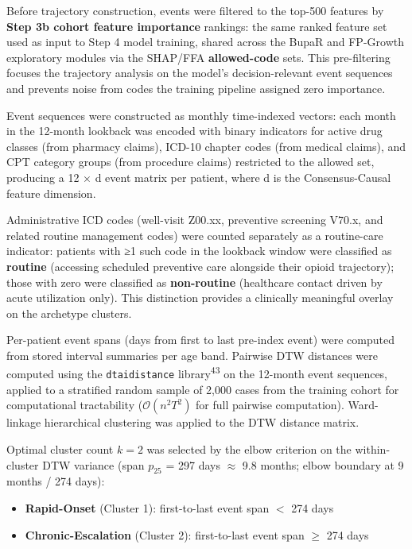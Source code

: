\documentclass[
  12pt,
]{book}
\providecommand{\tightlist}{%
  \setlength{\itemsep}{0pt}\setlength{\parskip}{0pt}}
\begin{document}
Before trajectory construction, events were filtered to the top-500
features by \textbf{Step 3b cohort feature importance} rankings: the
same ranked feature set used as input to Step 4 model training, shared
across the BupaR and FP-Growth exploratory modules via the SHAP/FFA
\textbf{allowed-code} sets. This pre-filtering focuses the trajectory
analysis on the model's decision-relevant event sequences and prevents
noise from codes the training pipeline assigned zero importance.

Event sequences were constructed as monthly time-indexed vectors: each
month in the 12-month lookback was encoded with binary indicators for
active drug classes (from pharmacy claims), ICD-10 chapter codes (from
medical claims), and CPT category groups (from procedure claims)
restricted to the allowed set, producing a 12 × d event matrix per
patient, where d is the Consensus-Causal feature dimension.

Administrative ICD codes (well-visit Z00.xx, preventive screening V70.x,
and related routine management codes) were counted separately as a
routine-care indicator: patients with ≥1 such code in the lookback
window were classified as \textbf{routine} (accessing scheduled
preventive care alongside their opioid trajectory); those with zero were
classified as \textbf{non-routine} (healthcare contact driven by acute
utilization only). This distinction provides a clinically meaningful
overlay on the archetype clusters.

Per-patient event spans (days from first to last pre-index event) were
computed from stored interval summaries per age band. Pairwise DTW
distances were computed using the \texttt{dtaidistance}
library\textsuperscript{43} on the 12-month event sequences, applied to
a stratified random sample of 2,000 cases from the training cohort for
computational tractability (\(\mathcal{O}(n^2 T^2)\) for full pairwise
computation). Ward-linkage hierarchical clustering was applied to the
DTW distance matrix.

Optimal cluster count \(k = 2\) was selected by the elbow criterion on
the within-cluster DTW variance (span \(p_{25}\) = 297 days \(\approx\)
9.8 months; elbow boundary at 9 months / 274 days):

\begin{itemize}
\tightlist
\item
  \textbf{Rapid-Onset} (Cluster 1): first-to-last event span \(<\) 274
  days
\item
  \textbf{Chronic-Escalation} (Cluster 2): first-to-last event span
  \(\geq\) 274 days
\end{itemize}
\end{document}
